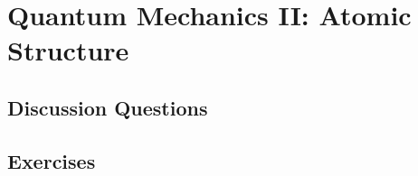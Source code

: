 
\chapter{Quantum Mechanics II: Atomic Structure}

\section{Discussion Questions}

\section{Exercises}
